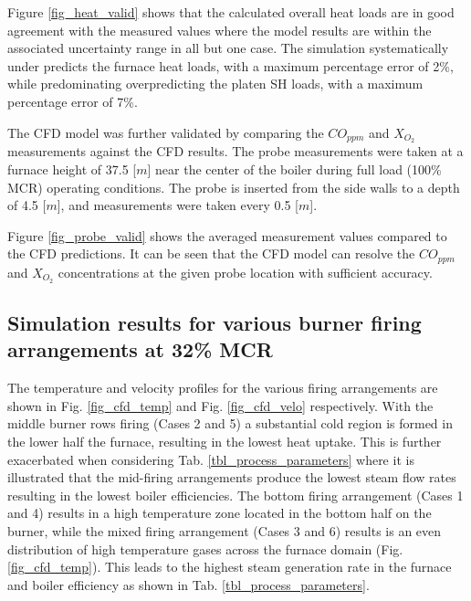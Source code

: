 \documentclass[11pt,cleanfoot]{asme2ej}
\begin{document}
Figure \ref{fig_heat_valid} shows that the calculated overall heat loads are in good agreement with the measured values where the model results are within the associated uncertainty range in all but one case. The simulation systematically under predicts the furnace heat loads, with a maximum percentage error of 2\%, while predominating overpredicting the platen SH loads, with a maximum percentage error of 7\%.

The CFD model was further validated by comparing the $CO_{ppm}$ and $X_{O_{2}}$ measurements against the CFD results. The probe measurements were taken at a furnace height of 37.5 [$m$] near the center of the boiler during full load (100\% MCR) operating conditions. The probe is inserted from the side walls to a depth of 4.5 [$m$], and measurements were taken every 0.5 [$m$].

Figure \ref{fig_probe_valid} shows the averaged measurement values compared to the CFD predictions. It can be seen that the CFD model can resolve the $CO_{ppm}$ and $X_{O_{2}}$ concentrations at the given probe location with sufficient accuracy.

\subsection{Simulation results for various burner firing arrangements at 32\% MCR }
The temperature and velocity profiles for the various firing arrangements are shown in Fig. \ref{fig_cfd_temp} and Fig. \ref{fig_cfd_velo} respectively. With the middle burner rows firing (Cases 2 and 5) a substantial cold region is formed in the lower half the furnace, resulting in the lowest heat uptake. This is further exacerbated when considering Tab. \ref{tbl_process_parameters} where it is illustrated that the mid-firing arrangements produce the lowest steam flow rates resulting in the lowest boiler efficiencies. The bottom firing arrangement (Cases 1 and 4) results in a high temperature zone located in the bottom half on the burner, while the mixed firing arrangement (Cases 3 and 6) results is an even distribution of high temperature gases across the furnace domain (Fig. \ref{fig_cfd_temp}). This leads to the highest steam generation rate in the furnace and boiler efficiency as shown in Tab. \ref{tbl_process_parameters}.
\end{document}
